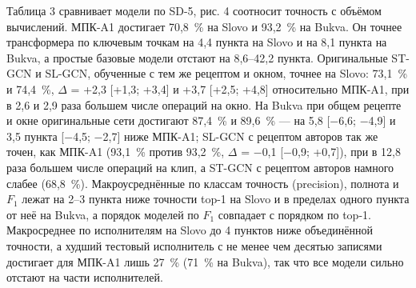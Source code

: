 \documentclass[a4paper,fleqn]{cas-dc}
\begin{document}
Таблица 3 сравнивает модели по SD-5, рис. 4 соотносит точность с объёмом вычислений. МПК-A1 достигает 70,8~\% на Slovo и 93,2~\% на Bukva. Он точнее трансформера по ключевым точкам на 4,4 пункта на Slovo и на 8,1 пункта на Bukva, а простые базовые модели отстают на 8,6--42,2 пункта. Оригинальные ST-GCN и SL-GCN, обученные с тем же рецептом и окном, точнее на Slovo: 73,1~\% и 74,4~\%, \(\Delta\) = +2,3 {[}+1,3; +3,4{]} и +3,7 {[}+2,5; +4,8{]} относительно МПК-A1, при в 2,6 и 2,9 раза большем числе операций на окно. На Bukva при общем рецепте и окне оригинальные сети достигают 87,4~\% и 89,6~\% --- на 5,8 {[}$-$6,6; $-$4,9{]} и 3,5 пункта {[}$-$4,5; $-$2,7{]} ниже МПК-A1; SL-GCN с рецептом авторов так же точен, как МПК-A1 (93,1~\% против 93,2~\%, \(\Delta\) = $-$0,1 {[}$-$0,9; +0,7{]}), при в 12,8 раза большем числе операций на клип, а ST-GCN с рецептом авторов намного слабее (68,8~\%). Макроусреднённые по классам точность (precision), полнота и \(F_1\) лежат на 2--3 пункта ниже точности top-1 на Slovo и в пределах одного пункта от неё на Bukva, а порядок моделей по \(F_1\) совпадает с порядком по top-1. Макросреднее по исполнителям на Slovo до 4 пунктов ниже объединённой точности, а худший тестовый исполнитель с не менее чем десятью записями достигает для МПК-A1 лишь 27~\% (71~\% на Bukva), так что все модели сильно отстают на части исполнителей.
\end{document}
